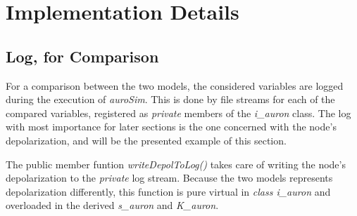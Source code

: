 \chapter{Implementation Details}


		\section{Log, for Comparison}
		\label{appendixLogForComparison}
			For a comparison between the two models, the considered variables are logged during the execution of \emph{auroSim}.
			This is done by file streams for each of the compared variables, registered as \emph{private} members of the \emph{i\_auron} class.
			The log with most importance for later sections is the one concerned with the node's depolarization, and will be the presented example of this section.

			The public member funtion \emph{writeDepolToLog()} takes care of writing the node's depolarization to the \emph{private} log stream.
			Because the two models represents depolarization differently, this function is pure virtual in \emph{class i\_auron} and overloaded in the derived \emph{s\_auron} and \emph{K\_auron}.

